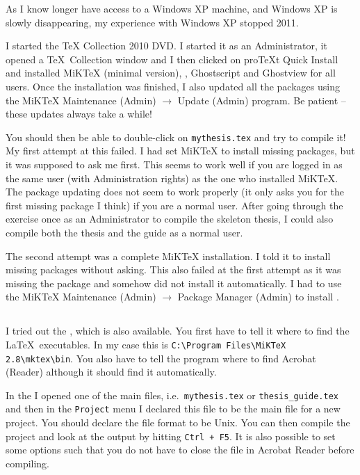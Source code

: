 As I know longer have access to a Windows XP machine, and Windows XP is
slowly disappearing, my experience with Windows XP stopped 2011.

I started the \TeX{} Collection 2010 DVD. I started it as an
Administrator, it opened a \TeX\ Collection window and I then clicked
on proTeXt Quick Install and installed MiK\TeX{} (minimal
version), \TeXnicCenter,
Ghostscript and Ghostview for all users. Once the installation was
finished, I also updated all the packages using the MiK\TeX{}
Maintenance (Admin) $\to$ Update (Admin) program. Be patient -- these
updates always take a while!

You should then be able to double-click on \texttt{mythesis.tex} and
try to compile it! My first attempt at this failed. I had set
MiK\TeX{} to install missing packages, but it was supposed to ask me
first. This seems to work well if you are logged in as the same user
(with Administration rights) as the one who installed MiK\TeX. The
package updating does not seem to work properly (it only asks you for
the first missing package I think) if you are a normal user. After
going through the exercise once as an Administrator to compile the
skeleton thesis, I could also compile both the thesis and the guide as
a normal user.

The second attempt was a complete MiK\TeX{} installation. I told it to
install missing packages without asking. This also failed at the first
attempt as it was missing the package  and somehow did
not install it automatically. I had to use the MiK\TeX{} Maintenance
(Admin) $\to$ Package Manager (Admin) to install .


\subsection{\TeXnicCenter}
\label{sec:app:texnic}

I tried out the \TeXnicCenter, which is also available. You first
have to tell it where to find the \LaTeX\ executables. In my case
this is \texttt{C:\textbackslash Program Files\textbackslash MiKTeX
  2.8\textbackslash mktex\textbackslash bin}. You also have to tell
the program where to find Acrobat (Reader) although it should find it
automatically.

In the \TeXnicCenter I opened one of the main files, i.e.\
\texttt{mythesis.tex} or \texttt{thesis\_guide.tex} and then in the
\texttt{Project} menu I declared this file to be the main file for a
new project. You should declare the file format to be Unix. You can
then compile the project and look at the output by hitting
\texttt{Ctrl + F5}. It is also possible to set some options such that
you do not have to close the file in Acrobat Reader before compiling.

